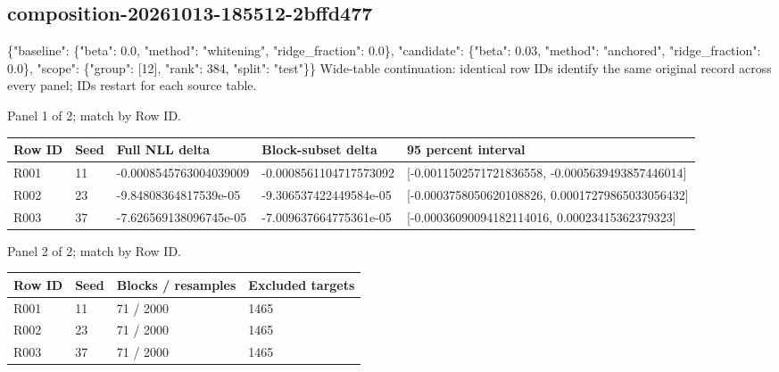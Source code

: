 \documentclass[10pt]{article}
\begin{document}
\subsection{composition-20261013-185512-2bffd477}
\{"baseline": \{"beta": 0.0, "method": "whitening", "ridge\_fraction": 0.0\}, "candidate": \{"beta": 0.03, "method": "anchored", "ridge\_fraction": 0.0\}, "scope": \{"group": [12], "rank": 384, "split": "test"\}\}
Wide-table continuation: identical row IDs identify the same original record across every panel; IDs restart for each source table.
\par\noindent Panel 1 of 2; match by Row ID.
{\scriptsize\setlength{\tabcolsep}{2pt}
\begin{longtable}{p{}p{}p{}p{}p{}}
Row ID & Seed & Full NLL delta & Block-subset delta & 95 percent interval \\
\hline\endhead
R001 & 11 & -0.0008545763004039009 & -0.0008561104717573092 & [-0.0011502571721836558, -0.0005639493857446014] \\
R002 & 23 & -9.84808364817539e-05 & -9.306537422449584e-05 & [-0.0003758050620108826, 0.00017279865033056432] \\
R003 & 37 & -7.626569138096745e-05 & -7.009637664775361e-05 & [-0.00036090094182114016, 0.00023415362379323] \\
\end{longtable}}
\par\noindent Panel 2 of 2; match by Row ID.
{\scriptsize\setlength{\tabcolsep}{2pt}
\begin{longtable}{p{}p{}p{}p{}}
Row ID & Seed & Blocks / resamples & Excluded targets \\
\hline\endhead
R001 & 11 & 71 / 2000 & 1465 \\
R002 & 23 & 71 / 2000 & 1465 \\
R003 & 37 & 71 / 2000 & 1465 \\
\end{longtable}}
\end{document}
